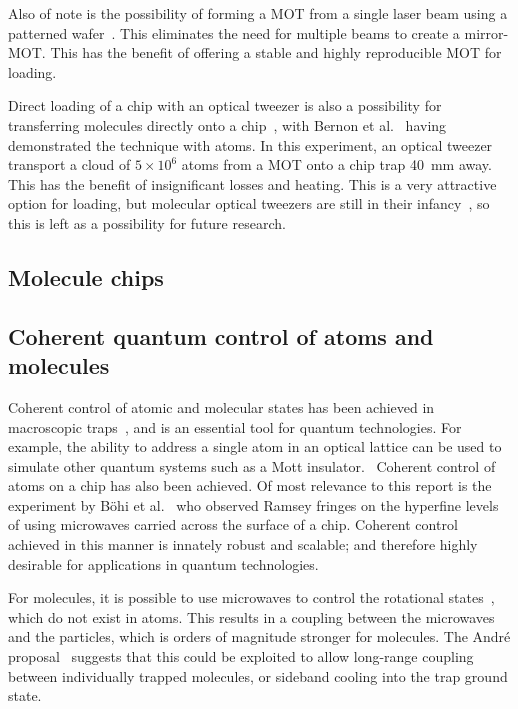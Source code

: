 Also of note is the possibility of forming a MOT from a single laser beam using
a patterned wafer~\cite{Nshii2013}. This eliminates the need for multiple beams
to create a mirror-MOT. This has the benefit of offering a stable and highly
reproducible MOT for loading.

Direct loading of a chip with an optical tweezer is also a possibility for
transferring molecules directly onto a chip~\cite{Liueaar7797}, with Bernon et
al.~\cite{Bernon2013} having demonstrated the technique with atoms. In this
experiment, an optical tweezer transport a cloud of $5\times10^6$ 
atoms from a MOT onto a chip trap \SI{40}{\milli\metre} away. This has the
benefit of insignificant losses and heating. This is a very attractive option
for loading, but molecular optical tweezers are still in their
infancy~\cite{Anderegg2019}, so this is left as a possibility for future
research.

\subsection{Molecule chips}
\label{litrev:molculechips}


\subsection{Coherent quantum control of atoms and molecules}
\label{litrev:control}

Coherent control of atomic and molecular states has been achieved in macroscopic
traps~, and is an essential tool for quantum technologies. For example, the
ability to address a single atom in an optical lattice can be used to simulate
other quantum systems such as a Mott insulator.~\cite{Weitenberg2011} Coherent
control of atoms on a chip has also been achieved. Of most relevance to this
report is the experiment by B\"ohi et al.~\cite{Boehi2009} who observed Ramsey
fringes on the hyperfine levels of  using microwaves carried across the
surface of a chip. Coherent control achieved in this manner is innately robust
and scalable; and therefore highly desirable for applications in quantum
technologies.~\cite{}

For molecules, it is possible to use microwaves to control the rotational
states~\cite{}, which do not exist in atoms. This results in a coupling between
the microwaves and the particles, which is orders of magnitude stronger for
molecules. The Andr\'e proposal~\cite{Andre2006} suggests that this could be
exploited to allow long-range coupling between individually trapped molecules,
or sideband cooling into the trap ground state.

